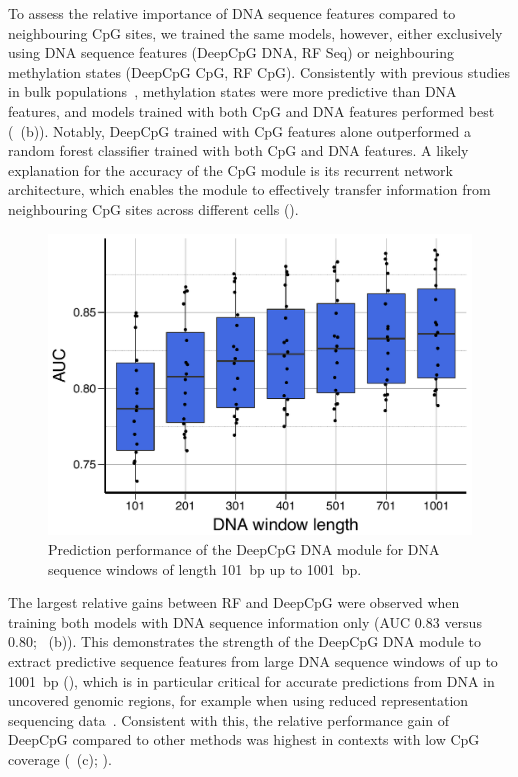 To assess the relative importance of DNA sequence features compared to neighbouring CpG sites, we trained the same models, however, either exclusively using DNA sequence features (DeepCpG DNA, RF Seq) or neighbouring methylation states (DeepCpG CpG, RF CpG). Consistently with previous studies in bulk populations~\citep{zhang_predicting_2015}, methylation states were more predictive than DNA features, and models trained with both CpG and DNA features performed best (~(b)). Notably, DeepCpG trained with CpG features alone outperformed a random forest classifier trained with both CpG and DNA features. A likely explanation for the accuracy of the CpG module is its recurrent network architecture, which enables the module to effectively transfer information from neighbouring CpG sites across different cells ().

\begin{figure}[htbp!]
  \begin{minipage}[c]{0.65\textwidth}
    \centering
    \includegraphics[width=1.0\textwidth]{dna_module_wlen}
  \end{minipage}
  \begin{minipage}[c]{0.32\textwidth}
    \caption[Prediction performance of the DeepCpG DNA module for DNA sequence windows of increasing length.]{Prediction performance of the DeepCpG DNA module for DNA sequence windows of length 101~bp up to 1001~bp.}
    \label{fig:dcpg_eval_dna_module_wlen}
  \end{minipage}
\end{figure}

The largest relative gains between RF and DeepCpG were observed when training both models with DNA sequence information only (AUC 0.83 versus 0.80; ~(b)). This demonstrates the strength of the DeepCpG DNA module to extract predictive sequence features from large DNA sequence windows of up to 1001~bp (), which is in particular critical for accurate predictions from DNA in uncovered genomic regions, for example when using reduced representation sequencing data~\citep{farlik_single-cell_2015,guo_single-cell_2013,hou_single-cell_2016}. Consistent with this, the relative performance gain of DeepCpG compared to other methods was highest in contexts with low CpG coverage (~(c); ).

